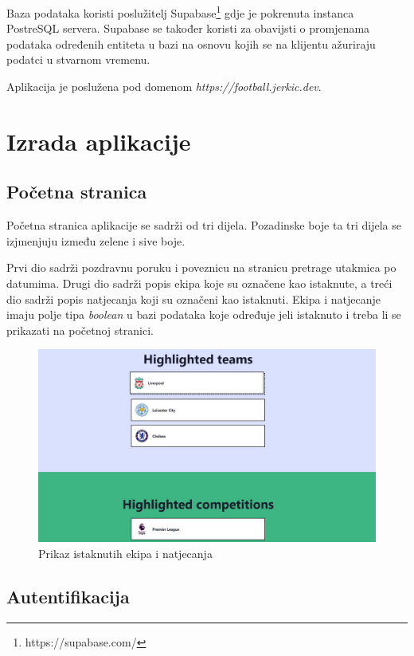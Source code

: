 \documentclass[times, utf8, zavrsni]{fer}
\begin{document}
Baza podataka koristi poslužitelj Supabase\footnote{https://supabase.com/} gdje je pokrenuta instanca PostreSQL servera.
Supabase se također koristi za obavijsti o promjenama podataka određenih entiteta u bazi na osnovu kojih se na klijentu ažuriraju podatci u stvarnom vremenu.

Aplikacija je poslužena pod domenom \emph{https://football.jerkic.dev}.

\chapter{Izrada aplikacije}

\section{Početna stranica}

Početna stranica aplikacije se sadrži od tri dijela. Pozadinske boje ta tri dijela se izjmenjuju između zelene i sive boje.

Prvi dio sadrži pozdravnu poruku i poveznicu na stranicu pretrage utakmica po datumima. Drugi dio sadrži popis ekipa koje su označene kao istaknute, a treći dio sadrži popis natjecanja koji su označeni kao istaknuti.
Ekipa i natjecanje imaju polje tipa \emph{boolean} u bazi podataka koje određuje jeli istaknuto i treba li se prikazati na početnoj stranici.

\begin{figure}[htb]
\centering
\includegraphics[width=14cm]{images/hero.jpg}
\caption{Prikaz istaknutih ekipa i natjecanja}
\label{fig:hero}
\end{figure}


\section{Autentifikacija}
\end{document}
